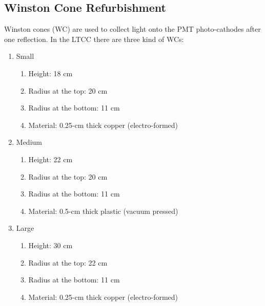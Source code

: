 \subsection{Winston Cone Refurbishment}

Winston cones (WC) are used to collect light onto the PMT photo-cathodes after one reflection.
In the LTCC there are three kind of WCs:

\begin{enumerate}

\item Small
	\begin{enumerate}
		\item Height: 18 cm
		\item Radius at the top: 20 cm
		\item Radius at the bottom: 11 cm
		\item Material: 0.25-cm thick copper (electro-formed)
	\end{enumerate}

	\item Medium
	\begin{enumerate}
		\item Height: 22 cm
		\item Radius at the top: 20 cm
		\item Radius at the bottom: 11 cm
		\item Material: 0.5-cm thick plastic (vacuum pressed)
	\end{enumerate}

	\item Large
	\begin{enumerate}
		\item Height: 30 cm
		\item Radius at the top: 22 cm
		\item Radius at the bottom: 11 cm
		\item Material: 0.25-cm thick copper (electro-formed)
	\end{enumerate}
\end{enumerate}

